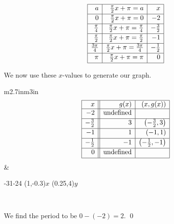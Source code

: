 \begin{ex}
\begin{enumerate}
\[\begin{array}{|r|r|r|}
\hline

 a & \frac{\pi}{2} x + \pi = a & x \\ [2pt] \hline
0  & \frac{\pi}{2} x + \pi = 0 &  -2 \\ [2pt]   \hline

\frac{\pi}{4}  &  \frac{\pi}{2} x + \pi  = \frac{\pi}{4} & -\frac{3}{2} \\ [2pt] \hline 

\frac{\pi}{2}  &  \frac{\pi}{2} x + \pi = \frac{\pi}{2} & -1 \\ [2pt] \hline 

\frac{3\pi}{4}  &  \frac{\pi}{2} x + \pi =\frac{3\pi}{4} & -\frac{1}{2} \\ [2pt] \hline 

\pi  & \frac{\pi}{2} x + \pi = \pi   &  0 \\  [2pt] \hline
\end{array} \]
\setlength{\extrarowheight}{0pt}

We now use these $x$-values to generate our graph.

\hspace{.25in} \begin{tabular}{m{2.7in}m{3in}}
\setlength{\extrarowheight}{2pt}
\[ \begin{array}{|r||r|r|}  

\hline

 x & g(x) & (x,g(x))  \\ \hline
-2  & \text{undefined} &   \\ [2pt]   \hline
-\frac{3}{2}  &  3 &  \left(-\frac{3}{2}, 3 \right) \\ [2pt] \hline 
-1 & 1 &  (-1,1)  \\ [2pt] \hline 
-\frac{1}{2}  & -1 &  \left(-\frac{1}{2}, -1 \right) \\ [2pt] \hline 
0 & \text{undefined} &  \\ [2pt] \hline 
\end{array} \] \setlength{\extrarowheight}{0pt} &

\begin{mfpic}[30][20]{-3}{1}{-2}{4}
\axes
\tlabel[cc](1,-0.3){\scriptsize $x$}
\tlabel[cc](0.25,4){\scriptsize $y$}
\tlpointsep{4pt}
\dashed {}
\arrow \reverse \arrow {}
\end{mfpic} \\

\end{tabular}

We find the period to be $0 - (-2) = 2$. \qed

\end{enumerate}
\end{ex}

